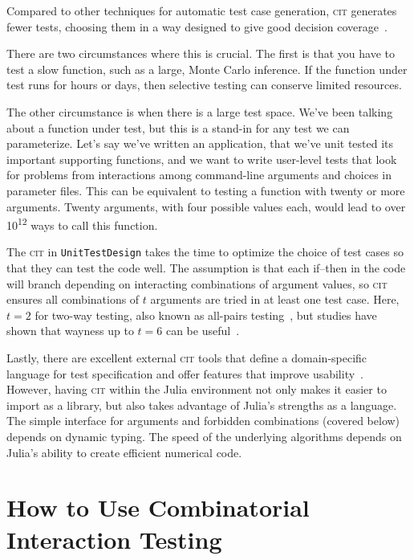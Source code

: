 \documentclass{juliacon}
\newcommand{\utd}{\texttt{UnitTestDesign}\xspace}
\newcommand{\cit}{\textsc{cit}\xspace}
\begin{document}
Compared to other techniques for automatic test case generation, \cit generates fewer tests, choosing them in a way designed to give good decision coverage~\cite{Nie2011-yl,Grindal2005-su,Kuhn2010-ak}.

\vskip 6pt
There are two circumstances where this is crucial. The first is that you have to test a slow function, such as a large, Monte Carlo inference. If the function under test runs for hours or days, then selective testing can conserve limited resources.

\vskip 6pt
The other circumstance is when there is a large test space. We've been talking about a function under test, but this is a stand-in for any test we can parameterize. Let's say we've written an application, that we've unit tested its important supporting functions, and we want to write user-level tests that look for problems from interactions among command-line arguments and choices in parameter files. This can be equivalent to testing a function with twenty or more arguments. Twenty arguments, with four possible values each, would lead to over 10\textsuperscript{12} ways to call this function.

\vskip 6pt
The \cit in \utd takes the time to optimize the choice of test cases so that they can test the code well. The assumption is that each if--then in the code will branch depending on interacting combinations of argument values, so \cit ensures all combinations of $t$ arguments are tried in at least one test case. Here, $t=2$ for two-way testing, also known as all-pairs testing~\cite{pairwise-website}, but studies have shown that wayness up to $t=6$ can be useful~\cite{Petke2015-ex}.

\vskip 6pt
Lastly, there are excellent external \cit tools that define a domain-specific language for test specification and offer features that improve usability~\cite{Czerwonka2006-hm,Kuhn2010-ak}. However, having \cit within the Julia environment not only makes it easier to import as a library, but also takes advantage of Julia's strengths as a language. The simple interface for arguments and forbidden combinations (covered below) depends on dynamic typing. The speed of the underlying algorithms depends on Julia's ability to create efficient numerical code.


\section{How to Use Combinatorial Interaction Testing}\label{sec:how-to-use}
\end{document}

